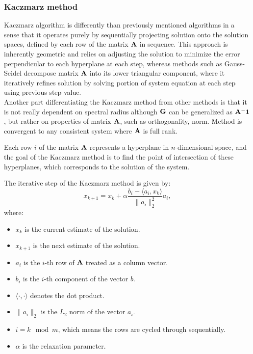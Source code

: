 \subsubsection*{Kaczmarz method}
Kaczmarz algorithm is differently than previously mentioned algorithms in a sense 
that it operates purely by sequentially projecting solution onto the solution spaces,
defined by each row of the matrix $\mathbf{A}$ in sequence. 
This approach is inherently geometric and relies on adjusting the solution to minimize 
the error perpendicular to each hyperplane at each step, whereas methods such as Gauss-Seidel decompose matrix $\mathbf{A}$ into its lower triangular component, 
where it iteratively refines solution by solving portion of system equation at each step using previous step value.\\
Another part differentiating the Kaczmarz method from other methods is that it is not really dependent on spectral radius although $\mathbf{G}$ can be generalized as $\mathbf{A^-1}$, but rather on properties of matrix $\mathbf{A}$, 
such as orthogonality, norm. Method is convergent to any consistent system where $\mathbf{A}$ is full rank.


Each row $i$ of the matrix $\mathbf{A}$ represents a hyperplane in $n$-dimensional space, and the goal of the Kaczmarz method is to find the point of intersection of these hyperplanes, which corresponds to the solution of the system.

The iterative step of the Kaczmarz method is given by:
\begin{equation}
    x_{k+1} = x_{k} + \alpha \frac{b_{i} - \langle a_{i}, x_{k} \rangle}{\|a_{i}\|_{2}^{2}} a_{i},
\end{equation}
where:
\begin{itemize}
    \item $x_{k}$ is the current estimate of the solution.
    \item $x_{k+1}$ is the next estimate of the solution.
    \item $a_{i}$ is the \(i\)-th row of $\mathbf{A}$ treated as a column vector.
    \item $b_{i}$ is the \(i\)-th component of the vector \(b\).
    \item $\langle \cdot, \cdot \rangle$ denotes the dot product.
    \item $\|a_{i}\|_{2}$ is the \(L_2\) norm of the vector \(a_{i}\).
    \item $i = k \mod m$, which means the rows are cycled through sequentially.
    \item $\alpha$ is the relaxation parameter.
\end{itemize}



